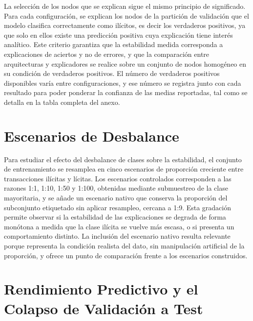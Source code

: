 La selección de los nodos que se explican sigue el mismo principio de significado. Para cada configuración, se explican los nodos de la partición de validación que el modelo clasifica correctamente como ilícitos, es decir los verdaderos positivos, ya que solo en ellos existe una predicción positiva cuya explicación tiene interés analítico. Este criterio garantiza que la estabilidad medida corresponda a explicaciones de aciertos y no de errores, y que la comparación entre arquitecturas y explicadores se realice sobre un conjunto de nodos homogéneo en su condición de verdaderos positivos. El número de verdaderos positivos disponibles varía entre configuraciones, y ese número se registra junto con cada resultado para poder ponderar la confianza de las medias reportadas, tal como se detalla en la tabla completa del anexo.

\section{Escenarios de Desbalance}

Para estudiar el efecto del desbalance de clases sobre la estabilidad, el conjunto de entrenamiento se resamplea en cinco escenarios de proporción creciente entre transacciones ilícitas y lícitas. Los escenarios controlados corresponden a las razones 1:1, 1:10, 1:50 y 1:100, obtenidas mediante submuestreo de la clase mayoritaria, y se añade un escenario nativo que conserva la proporción del subconjunto etiquetado sin aplicar resampleo, cercana a 1:9. Esta gradación permite observar si la estabilidad de las explicaciones se degrada de forma monótona a medida que la clase ilícita se vuelve más escasa, o si presenta un comportamiento distinto. La inclusión del escenario nativo resulta relevante porque representa la condición realista del dato, sin manipulación artificial de la proporción, y ofrece un punto de comparación frente a los escenarios construidos.

\section{Rendimiento Predictivo y el Colapso de Validación a Test}

